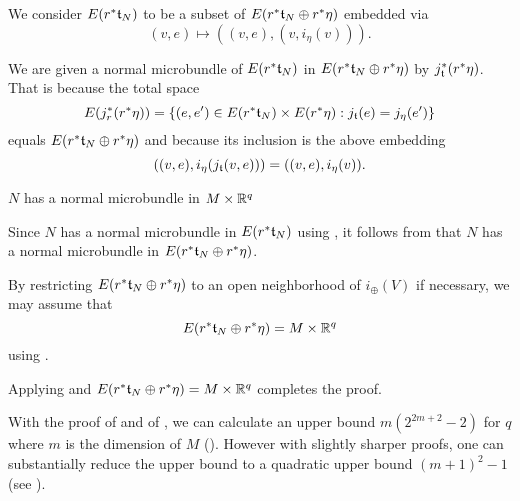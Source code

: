 \begin{scope}
\begin{myproof}
\begin{steps}
            We consider $E(r^*\mathfrak{t}_N)$ to be a subset of $E(r^*\mathfrak{t}_N \oplus{} r^*\eta)$ embedded via
            \[ (v, e) \mapsto ((v, e), (v, i_{\eta}(v))). \]

            We are given a normal microbundle of $E(r^*\mathfrak{t}_N)$ in $E(r^*\mathfrak{t}_N \oplus{} r^*\eta)$ by $j_{\mathfrak{t}}^*(r^*\eta)$.
            That is because the total space
            \[ E(j_r^*(r^*\eta)) = \{(e, e') \in E(r^*\mathfrak{t}_N) \times E(r^*\eta):j_{\mathfrak{t}}(e) = j_\eta(e')\} \]
            equals $E(r^*\mathfrak{t}_N \oplus{} r^*\eta)$ and because its inclusion is the above embedding
            \[ ((v, e), i_\eta(j_{\mathfrak{t}}(v, e))) = ((v, e), i_\eta(v)). \]
            
            \item $N$ has a normal microbundle in $M \times \mathbb{R}^q$
            
            Since $N$ has a normal microbundle in $E(r^*\mathfrak{t}_N)$ using ,
            it follows from  that
            $N$ has a normal microbundle in $E(r^*\mathfrak{t}_N \oplus{} r^*\eta)$.
     
            By restricting $E(r^*\mathfrak{t}_N \oplus{} r^*\eta)$ to an open neighborhood of $i_{\oplus}(V)$ if necessary, we may assume that
             \[ E(r^*\mathfrak{t}_N \oplus{} r^*\eta) = M \times \mathbb{R}^q \]
            using .
        \end{steps}
        Applying  and $E(r^*\mathfrak{t}_N \oplus{} r^*\eta) = M \times \mathbb{R}^q$ completes the proof.
    \end{myproof}

    \begin{myparagraph}
        With the proof of  and of ,
        we can calculate an upper bound $m(2^{2m + 2} - 2)$ for $q$ where $m$ is the dimension of $M$ (\cite[p.63]{milnor}).
        However with slightly sharper proofs,
        one can substantially reduce the upper bound
        to a quadratic upper bound $(m + 1)^2 - 1$ (see \cite[p.232]{hirsch}). 
    \end{myparagraph}
\end{scope}